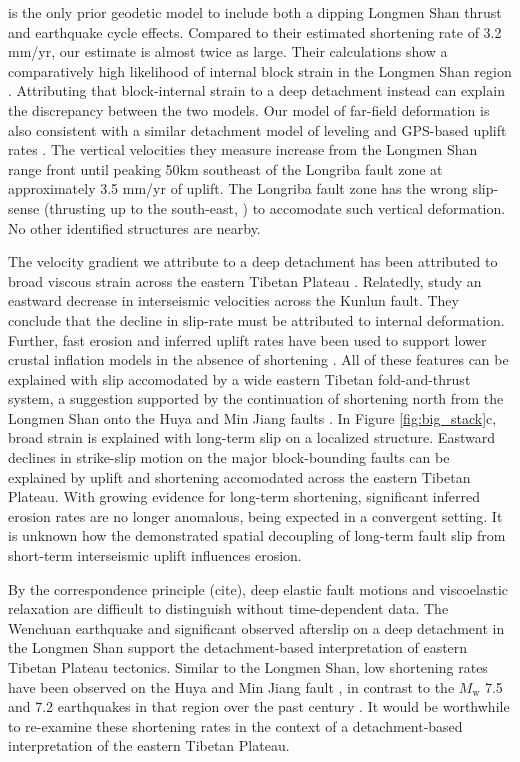 \documentclass[12pt]{article}
\begin{document}
\citet{Loveless2011} is the only prior geodetic model to include both a dipping Longmen Shan thrust and earthquake cycle effects. Compared to their estimated shortening rate of 3.2 mm/yr, our estimate is almost twice as large.  Their calculations show a comparatively high likelihood of internal block strain in the Longmen Shan region \citep{Loveless2011}. Attributing that block-internal strain to a deep detachment instead can explain the discrepancy between the two models. Our model of far-field deformation is also consistent with a similar detachment model of leveling and GPS-based uplift rates \citep{Hao2014}. The vertical velocities they measure increase from the Longmen Shan range front until peaking 50km southeast of the Longriba fault zone at approximately 3.5 mm/yr of uplift. The Longriba fault zone has the wrong slip-sense (thrusting up to the south-east, \citep{Ren2013}) to accomodate such vertical deformation. No other identified structures are nearby. 

The velocity gradient we attribute to a deep detachment has been attributed to broad viscous strain across the eastern Tibetan Plateau \citep{Royden2008}. Relatedly, \citet{kirby07} study an eastward decrease in interseismic velocities across the Kunlun fault. They conclude that the decline in slip-rate must be attributed to internal deformation. Further, fast erosion and inferred uplift rates have been used to support lower crustal inflation models in the absence of shortening \citep{Kirby2003}. All of these features can be explained with slip accomodated by a wide eastern Tibetan fold-and-thrust system, a suggestion supported by the continuation of shortening north from the Longmen Shan onto the Huya \citep{kirby00} and Min Jiang faults \citep{Chen1994}. In Figure \ref{fig:big_stack}c, broad strain is explained with long-term slip on a localized structure. Eastward declines in strike-slip motion on the major block-bounding faults can be explained by uplift and shortening accomodated across the eastern Tibetan Plateau. With growing evidence for long-term shortening, significant inferred erosion rates are no longer anomalous, being expected in a convergent setting. It is unknown how the demonstrated spatial decoupling of long-term fault slip from short-term interseismic uplift influences erosion. 

By the correspondence principle (cite), deep elastic fault motions and viscoelastic relaxation are difficult to distinguish without time-dependent data. The Wenchuan earthquake and significant observed afterslip on a deep detachment \citep{Qi2011, Huang2014} in the Longmen Shan support the detachment-based interpretation of eastern Tibetan Plateau tectonics. Similar to the Longmen Shan, low shortening rates have been observed on the Huya and Min Jiang fault \citep{Kirby2000}, in contrast to the $M_{\textrm{w}}$ 7.5 and 7.2 earthquakes in that region over the past century \citep{Chen1994}. It would be worthwhile to re-examine these shortening rates in the context of a detachment-based interpretation of the eastern Tibetan Plateau. 
\end{document}
